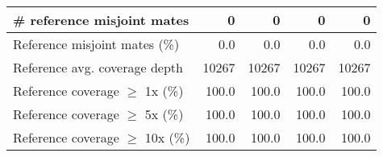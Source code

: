 \documentclass[12pt,a4paper]{article}
\begin{document}
\begin{table}[ht]
\begin{center}
\begin{tabular}{|l*{4}{|r}|}
\# reference misjoint mates & 0 & 0 & 0 & 0 \\ \hline
Reference misjoint mates (\%) & 0.0 & 0.0 & 0.0 & 0.0 \\ \hline
Reference avg. coverage depth & 10267 & 10267 & 10267 & 10267 \\ \hline
Reference coverage $\geq$ 1x (\%) & 100.0 & 100.0 & 100.0 & 100.0 \\ \hline
Reference coverage $\geq$ 5x (\%) & 100.0 & 100.0 & 100.0 & 100.0 \\ \hline
Reference coverage $\geq$ 10x (\%) & 100.0 & 100.0 & 100.0 & 100.0 \\ \hline
\end{tabular}
\end{center}
\end{table}
\end{document}
